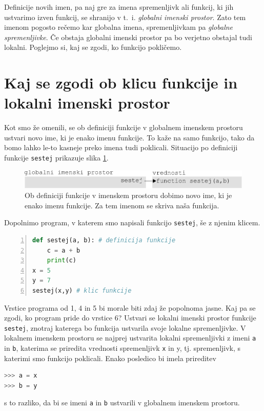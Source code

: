 Definicije novih imen, pa naj gre za imena spremenljivk ali funkcij, ki jih ustvarimo izven funkcij, se shranijo v t.~i. \emph{globalni imenski prostor}. Zato tem imenom pogosto rečemo kar globalna imena, spremenljivkam pa \emph{globalne spremenljivke}. Če obstaja globalni imenski prostor pa bo verjetno obstajal tudi lokalni. Poglejmo si, kaj se zgodi, ko funkcijo pokličemo.

\section{Kaj se zgodi ob klicu funkcije in lokalni imenski prostor}
Kot smo že omenili, se ob definiciji funkcije v globalnem imenskem prostoru ustvari novo ime, ki je enako imenu funkcije. To kaže na samo funkcijo, tako da bomo lahko le-to kasneje preko imena tudi poklicali. Situacijo po definiciji funkcije \texttt{sestej} prikazuje slika \ref{img:imenski_prostor_2}. \begin{figure}
    \includegraphics[width=\linewidth]{img/imenski_prostor_2.pdf}
    \caption{Ob definiciji funkcije v imenskem prostoru dobimo novo ime, ki je enako imenu funkcije. Za tem imenom se skriva naša funkcija.}
    \label{img:imenski_prostor_2}
\end{figure}

Dopolnimo program, v katerem smo napisali funkcijo \texttt{sestej}, še z njenim klicem.
\begin{lstlisting}[language=Python,numbers=left]
def sestej(a, b): # definicija funkcije
    c = a + b
    print(c)
x = 5
y = 7
sestej(x,y) # klic funkcije
\end{lstlisting}
Vrstice programa od 1, 4 in 5 bi morale biti zdaj že popolnoma jasne. Kaj pa se zgodi, ko program pride do vrstice 6? Ustvari se lokalni imenski prostor funkcije \texttt{sestej}, znotraj katerega bo funkcija ustvarila svoje lokalne spremenljivke. V lokalnem imenskem prostoru se najprej ustvarita lokalni spremenljivki z imeni \texttt{a} in \texttt{b}, katerima se priredita vrednosti spremenljivk \texttt{x} in {y}, tj. spremenljivk, s katerimi smo funkcijo poklicali. Enako posledico bi imela prireditev
\begin{lstlisting}[language=Python]
>>> a = x
>>> b = y
\end{lstlisting}
s to razliko, da bi se imeni \texttt{a} in \texttt{b} ustvarili v globalnem imenskem prostoru.

